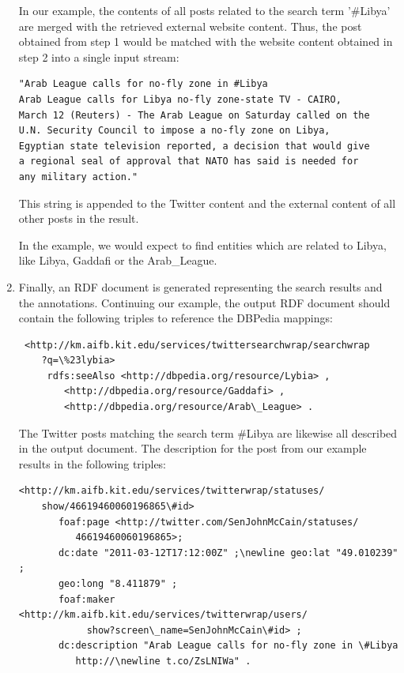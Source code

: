 \documentclass{llncs}
\begin{document}
\begin{enumerate}
In our example, the contents of all posts related to the search term '\#Libya'
are merged with the retrieved external website content. Thus, the post obtained from
step 1 would be matched with the website content obtained in step 2 into a
single input stream:
\begin{verbatim}"Arab League calls for no-fly zone in #Libya
Arab League calls for Libya no-fly zone-state TV - CAIRO, 
March 12 (Reuters) - The Arab League on Saturday called on the 
U.N. Security Council to impose a no-fly zone on Libya, 
Egyptian state television reported, a decision that would give
a regional seal of approval that NATO has said is needed for 
any military action."
\end{verbatim}
This string is appended to the Twitter content and the external content of all other posts in the result.

In the example, we would expect to find entities which are related to Libya,
like Libya, Gaddafi or the Arab\_League.

	\item	Finally, an RDF document is generated representing the search results and
	the annotations. Continuing our example, the output RDF document should contain the following
	triples to reference the DBPedia mappings:
	{\small\begin{verbatim}	<http://km.aifb.kit.edu/services/twittersearchwrap/searchwrap
	?q=\%23lybia>
     rdfs:seeAlso <http://dbpedia.org/resource/Lybia> ,
        <http://dbpedia.org/resource/Gaddafi> ,
        <http://dbpedia.org/resource/Arab\_League> .\end{verbatim}}
	The Twitter posts matching the search term \#Libya are likewise all described
	in the output document. The description for the post from our example 
	results in the following triples:
	{\small\begin{verbatim}<http://km.aifb.kit.edu/services/twitterwrap/statuses/
	show/46619460060196865\#id> 
	   foaf:page <http://twitter.com/SenJohnMcCain/statuses/
	      46619460060196865>;
	   dc:date "2011-03-12T17:12:00Z" ;\newline geo:lat "49.010239" ;
	   geo:long "8.411879" ;
	   foaf:maker <http://km.aifb.kit.edu/services/twitterwrap/users/
		    show?screen\_name=SenJohnMcCain\#id> ;
	   dc:description "Arab League calls for no-fly zone in \#Libya 
	      http://\newline t.co/ZsLNIWa" . \end{verbatim}}     
\end{enumerate}
\end{document}
